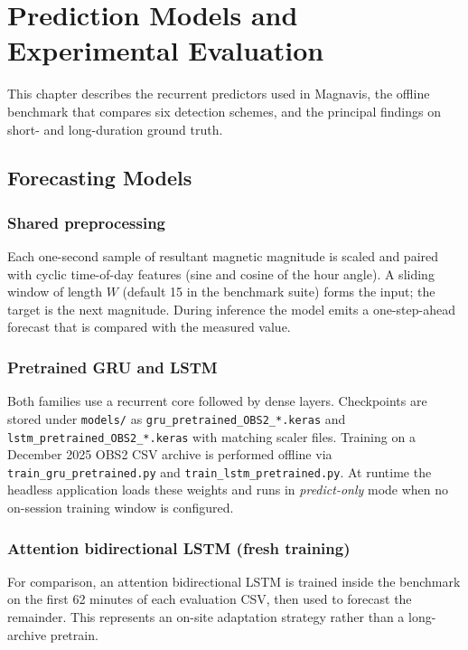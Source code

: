 \chapter{Prediction Models and Experimental Evaluation}
\label{Chapter5}

This chapter describes the recurrent predictors used in Magnavis, the offline benchmark that compares six detection schemes, and the principal findings on short- and long-duration ground truth.

\section{Forecasting Models}
\subsection{Shared preprocessing}
Each one-second sample of resultant magnetic magnitude is scaled and paired with cyclic time-of-day features (sine and cosine of the hour angle). A sliding window of length $W$ (default 15 in the benchmark suite) forms the input; the target is the next magnitude. During inference the model emits a one-step-ahead forecast that is compared with the measured value.

\subsection{Pretrained GRU and LSTM}
Both families use a recurrent core followed by dense layers. Checkpoints are stored under \texttt{models/} as \texttt{gru\_pretrained\_OBS2\_*.keras} and \texttt{lstm\_pretrained\_OBS2\_*.keras} with matching scaler files. Training on a December 2025 OBS2 CSV archive is performed offline via \texttt{train\_gru\_pretrained.py} and \texttt{train\_lstm\_pretrained.py}. At runtime the headless application loads these weights and runs in \emph{predict-only} mode when no on-session training window is configured.

\subsection{Attention bidirectional LSTM (fresh training)}
For comparison, an attention bidirectional LSTM is trained inside the benchmark on the first 62 minutes of each evaluation CSV, then used to forecast the remainder. This represents an on-site adaptation strategy rather than a long-archive pretrain.

